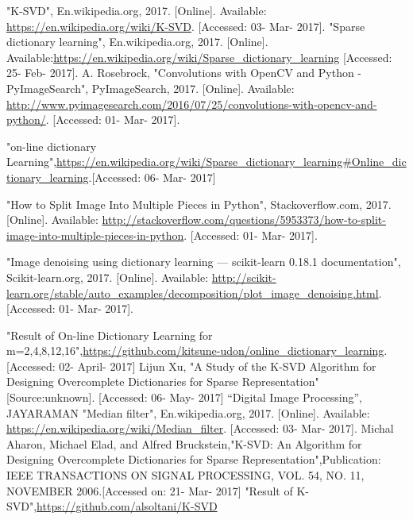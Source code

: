 \documentclass[journal]{IEEEtran}
\begin{document}
	
	\begin{thebibliography}{8}
	"K-SVD", En.wikipedia.org, 2017. [Online]. Available: \url{https://en.wikipedia.org/wiki/K-SVD}. [Accessed: 03- Mar- 2017].	
	"Sparse dictionary learning", En.wikipedia.org, 2017. [Online]. Available:\url{https://en.wikipedia.org/wiki/Sparse_dictionary_learning}	[Accessed: 25- Feb- 2017].
	A.  Rosebrock, "Convolutions with OpenCV and Python - PyImageSearch", PyImageSearch, 2017. [Online]. Available:\url{ http://www.pyimagesearch.com/2016/07/25/convolutions-with-opencv-and-python/}. [Accessed: 01- Mar- 2017].
	
	"on-line dictionary Learning",\url{https://en.wikipedia.org/wiki/Sparse_dictionary_learning#Online_dictionary_learning}.[Accessed: 06- Mar- 2017]
	
	"How to Split Image Into Multiple Pieces in Python", Stackoverflow.com, 2017. [Online]. Available: \url{http://stackoverflow.com/questions/5953373/how-to-split-image-into-multiple-pieces-in-python}. [Accessed: 01- Mar- 2017].
	
	"Image denoising using dictionary learning — scikit-learn 0.18.1 documentation", Scikit-learn.org, 2017. [Online]. Available: \url{http://scikit-learn.org/stable/auto_examples/decomposition/plot_image_denoising.html}. [Accessed: 01- Mar- 2017].
	
	"Result of On-line Dictionary Learning for m=2,4,8,12,16",\url{https://github.com/kitsune-udon/online_dictionary_learning}.[Accessed: 02- April- 2017]
	Lijun Xu, "A Study of the K-SVD Algorithm for Designing Overcomplete Dictionaries for Sparse Representation" [Source:unknown]. [Accessed: 06- May- 2017]
	“Digital Image Processing”, JAYARAMAN
	"Median filter", En.wikipedia.org, 2017. [Online]. Available: \url{https://en.wikipedia.org/wiki/Median_filter}. [Accessed: 03- Mar- 2017].
	Michal Aharon, Michael Elad, and Alfred Bruckstein,"K-SVD: An Algorithm for Designing Overcomplete Dictionaries for Sparse Representation",Publication: IEEE TRANSACTIONS ON SIGNAL PROCESSING, VOL. 54, NO. 11, NOVEMBER 2006.[Accessed on: 21- Mar- 2017]
	"Result of K-SVD",\url{https://github.com/alsoltani/K-SVD}
	
	
		
	\end{thebibliography}
	
	
	
\end{document}
